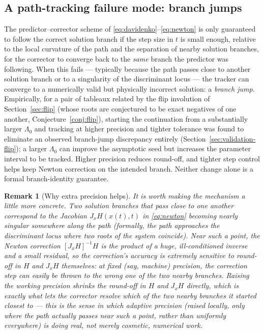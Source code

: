 \documentclass[11pt]{article}
\newtheorem{remark}{Remark}[section]
\begin{document}
\subsection{A path-tracking failure mode: branch jumps}
\label{sec:branch-jump-formal}

The predictor--corrector scheme of \eqref{eq:davidenko}--\eqref{eq:newton}
is only guaranteed to follow the correct solution branch if the step size
in $t$ is small enough, relative to the local curvature of the path and
the separation of nearby solution branches, for the corrector to converge
back to the \emph{same} branch the predictor was following. When this
fails --- typically because the path passes close to another solution
branch or to a singularity of the discriminant locus --- the tracker can
converge to a numerically valid but physically incorrect solution: a
\emph{branch jump}. Empirically, for a pair of tableaux related by the
flip involution of Section~\ref{sec:flip} (whose roots are conjectured to
be exact negatives of one another, Conjecture~\ref{conj:flip}), starting
the continuation from a substantially larger $\Lambda_0$ and tracking at
higher precision and tighter tolerance was found to eliminate an observed
branch-jump discrepancy entirely (Section~\ref{sec:validation-flip}); a larger $\Lambda_0$ can improve the asymptotic seed but increases
the parameter interval to be tracked. Higher precision reduces round-off,
and tighter step control helps keep Newton correction on the intended
branch. Neither change alone is a formal branch-identity guarantee.

\begin{remark}[Why extra precision helps]
It is worth making the mechanism a little more concrete. Two solution
branches that pass close to one another correspond to the Jacobian
$J_xH(x(t),t)$ in \eqref{eq:newton} becoming nearly singular somewhere
along the path (formally, the path approaches the \emph{discriminant
locus} where two roots of the system coincide). Near such a point, the
Newton correction $[J_xH]^{-1}H$ is the product of a huge, ill-conditioned
inverse and a small residual, so the correction's accuracy is extremely
sensitive to round-off in $H$ and $J_xH$ themselves: at fixed (say,
machine) precision, the correction step can easily be thrown to the
\emph{wrong} one of the two nearby branches. Raising the working
precision shrinks the round-off in $H$ and $J_xH$ directly, which is
exactly what lets the corrector resolve which of the two nearby branches
it started closest to --- this is the sense in which \emph{adaptive}
precision (raised locally, only where the path actually passes near such
a point, rather than uniformly everywhere) is doing real, not merely
cosmetic, numerical work.
\end{remark}
\end{document}
